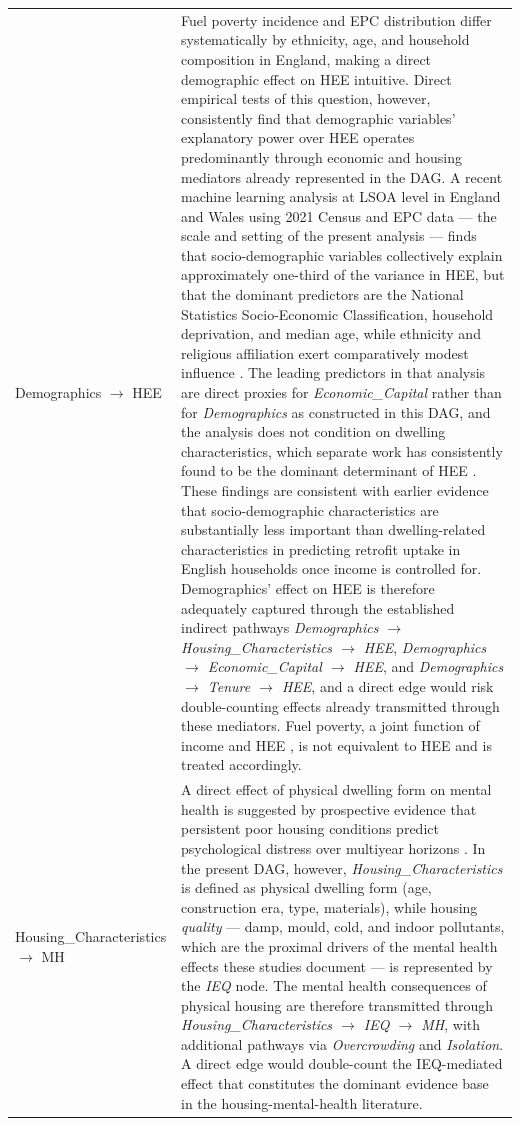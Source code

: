 \begin{longtable}{@{}p{3.8cm}p{11.2cm}@{}}
Demographics $\to$ HEE & Fuel poverty incidence and EPC distribution differ systematically by ethnicity, age, and household composition in England, making a direct demographic effect on HEE intuitive. Direct empirical tests of this question, however, consistently find that demographic variables' explanatory power over HEE operates predominantly through economic and housing mediators already represented in the DAG. A recent machine learning analysis at LSOA level in England and Wales using 2021 Census and EPC data — the scale and setting of the present analysis — finds that socio-demographic variables collectively explain approximately one-third of the variance in HEE, but that the dominant predictors are the National Statistics Socio-Economic Classification, household deprivation, and median age, while ethnicity and religious affiliation exert comparatively modest influence \citep{au_yong_assessing_2026}. The leading predictors in that analysis are direct proxies for \textit{Economic\_Capital} rather than for \textit{Demographics} as constructed in this DAG, and the analysis does not condition on dwelling characteristics, which separate work has consistently found to be the dominant determinant of HEE \citep{trotta_factors_2018, trotta_determinants_2018, sheridan_energy_2023, buyuklieva_variations_2024}. These findings are consistent with earlier evidence that socio-demographic characteristics are substantially less important than dwelling-related characteristics in predicting retrofit uptake in English households once income is controlled for. Demographics' effect on HEE is therefore adequately captured through the established indirect pathways \textit{Demographics $\to$ Housing\_Characteristics $\to$ HEE}, \textit{Demographics $\to$ Economic\_Capital $\to$ HEE}, and \textit{Demographics $\to$ Tenure $\to$ HEE}, and a direct edge would risk double-counting effects already transmitted through these mediators. Fuel poverty, a joint function of income and HEE \citep{department_for_energy_security_and_net_zero_annual_2024}, is not equivalent to HEE and is treated accordingly. \\
\addlinespace
Housing\_Characteristics $\to$ MH & A direct effect of physical dwelling form on mental health is suggested by prospective evidence that persistent poor housing conditions predict psychological distress over multiyear horizons \citep{pevalin_impact_2017, singh_housing_2019}. In the present DAG, however, \textit{Housing\_Characteristics} is defined as physical dwelling form (age, construction era, type, materials), while housing \textit{quality} — damp, mould, cold, and indoor pollutants, which are the proximal drivers of the mental health effects these studies document — is represented by the \textit{IEQ} node. The mental health consequences of physical housing are therefore transmitted through \textit{Housing\_Characteristics $\to$ IEQ $\to$ MH}, with additional pathways via \textit{Overcrowding} and \textit{Isolation}. A direct edge would double-count the IEQ-mediated effect that constitutes the dominant evidence base in the housing-mental-health literature. \\

\end{longtable}
